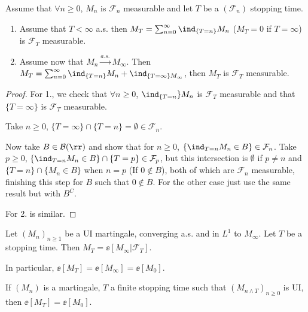\documentclass[../main.tex]{subfiles}
\begin{document}
\begin{lemma}
    Assume that $\forall n \geq 0$, $M_n$ is $\mathcal{F}_n$ measurable and let
    $T$ be a $(\mathcal{F}_n)$ stopping time.
    \begin{enumerate}
      \item Assume that $T < \infty$ a.s.
      then $M_T = \sum_{n=0}^\infty \ind_{\{ T =n \}} M_n$ ($M_T=0$ if $T =
        \infty$) is $\mathcal{F}_T$ measurable.
      \item Assume now that $M_n \overset{a.s.}{\longrightarrow} M_{\infty}$.
        Then $M_T = \sum_{n=0}^\infty \ind_{\{T=n\}} M_n + \ind_{\{ T = \infty
        \} M_{\infty}}$, then $M_T$ is $\mathcal{F}_T$ measurable.
    \end{enumerate}
\end{lemma}
\begin{proof}
  For 1., we check that $\forall n \geq 0$, $\ind_{\{T = n}\}M_n $ is
  $\mathcal{F}_T$ measurable and that $\{ T = \infty \} $ is $\mathcal{F}_T$
  measurable.

  Take $n \geq 0$, $\{ T = \infty \} \cap \{ T = n \} = \emptyset \in
  \mathcal{F}_n$. 

  Now take $B \in \mathcal{B}(\rr)$ and show that for $n \geq
  0$,  $\{ \ind_{T = n} M_n \in B \} \in \mathcal{F}_n$. Take $p \geq 0$,
  $\{ \ind_{T = n} M_n \in B \} \cap \{ T = p \} \in \mathcal{F}_p$, but this
  intersection is $\emptyset$ if $p \neq n$ and $\{ T = n \} \cap \{ M_n \in B
  \} $ when $n = p$ (If $0 \not\in B$), both of which are $\mathcal{F}_n$
  measurable, finishing this step for $B$ such that $0 \not\in B$. For the other
  case just use the same result but with $B^C$.

  For 2. is similar. 
\end{proof}

\begin{theorem}
  Let $(M_n)_{n \geq 1}$ be a UI martingale, converging a.s. and in $L^1$ to
  $M_{\infty}$. Let $T$ be a stopping time. Then $M_T = \ee[M_{\infty} |
  \mathcal{F}_T]$.

  In particular, $\ee[M_T] = \ee[M_{\infty}] = \ee[M_0]$.
\end{theorem}

\begin{corollary}
  If  $(M_n)$ is a martingale, $T$ a finite stopping time such that $(M_{n
  \wedge T})_{n \geq 0}$ is UI, then $\ee[M_T] = \ee[M_0]$.
\end{corollary}
\end{document}
